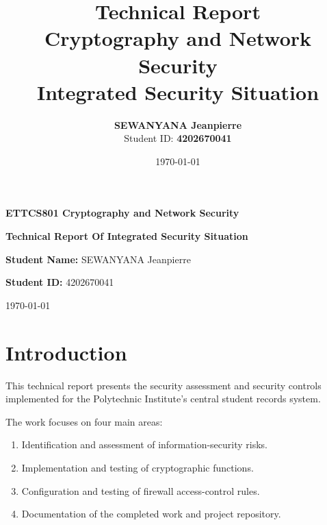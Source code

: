 \documentclass[12pt,a4paper]{article}
\title{
    \textbf{Technical Report}\\[0.3cm]
    \large Cryptography and Network Security\\
    \large Integrated Security Situation
}
\author{
    \textbf{SEWANYANA Jeanpierre}\\
    Student ID: \textbf{4202670041}
}
\date{\today}
\begin{document}
\begin{titlepage}

\centering

\vspace*{3cm}

{\Large \textbf{ETTCS801 Cryptography and Network Security}\par}

\vspace{1.5cm}

{\Huge \textbf{Technical Report Of Integrated Security Situation}\par}


\vspace{3.5cm}

{\large
\textbf{Student Name:} SEWANYANA Jeanpierre
\par}

\vspace{0.6cm}

{\large
\textbf{Student ID:} 4202670041
\par}

\vspace{0.4cm}

\vfill

{\large \today\par}

\end{titlepage}


\section{Introduction}

This technical report presents the security assessment and security controls implemented for the Polytechnic Institute's central student records system.

The work focuses on four main areas:

\begin{enumerate}
    \item Identification and assessment of information-security risks.
    \item Implementation and testing of cryptographic functions.
    \item Configuration and testing of firewall access-control rules.
    \item Documentation of the completed work and project repository.
\end{enumerate}
\end{document}
